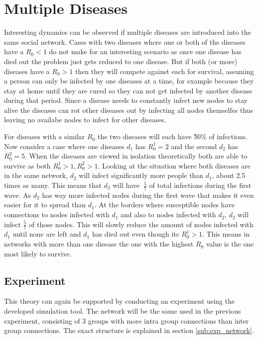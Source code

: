 \section{Multiple Diseases}
Interesting dynamics can be observed if multiple diseases are introduced into the same social network. Cases with two diseases where one or both of the diseases have a $R_0 < 1$ do not make for an interesting scenario as once one disease has died out the problem just gets reduced to one disease. But if both (or more) diseases have a $R_0 > 1$ then they will compete against each for survival, assuming a person can only be infected by one diseases at a time, for example because they stay at home until they are cured so they can not get infected by another disease during that period. Since a disease needs to constantly infect new nodes to stay alive the diseases can rot other diseases out by infecting all nodes themselfes thus leaving no availabe nodes to infect for other diseases.

For diseases with a similar $R_0$ the two diseases will each have \~50\% of infections. Now consider a case where one diseases $d_1$ has $R_0^1=2$ and the second $d_2$ has $R_0^2=5$. When the diseases are viewed in isolation theoretically both are able to survive as both $R_0^1 > 1, R_0^2>1$. Looking at the situation where both diseases are in the same network, $d_2$ will infect significantly more people than $d_1$, about 2.5 times as many. This means that $d_2$ will have $~\frac{5}{7}$ of total infections during the first wave. As $d_2$ has way more infected nodes during the first wave that makes it even easier for it to spread than $d_1$. At the borders where susceptible nodes have connections to nodes infected with $d_1$ and also to nodes infected with $d_2$, $d_2$ will infect $\frac{5}{7}$ of those nodes. This will slowly reduce the amount of nodes infected with $d_1$ until none are left and $d_1$ has died out even though its $R_0^1>1$. This means in networks with more than one disease the one  with the highest $R_0$ value is the one most likely to survive.

\subsection{Experiment}
This theory can again be supported by conducting an experiment using the developed simulation tool. The network will be the same used in the previous experiment, consisting of 3 groups with more intra group connections than inter group connections. The exact structure is explained in section \ref{sub:exp_network}.

